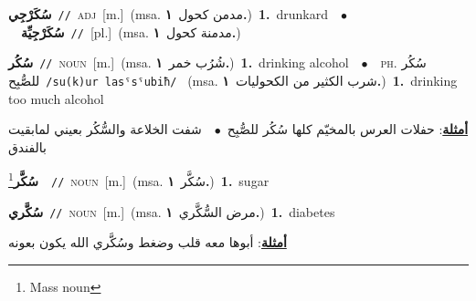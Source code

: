 \documentclass[10pt,a4paper,twoside]{article} %
\begin{document}
\begin{multicols}{2}
{\setlength\topsep{0pt}\textbf{\foreignlanguage{arabic}{سُكَرْجِي}}\ {\color{gray}\texttt{//}\color{black}}\ \textsc{adj}\ [m.]\ \color{gray}(msa. \foreignlanguage{arabic}{مدمن كحول}~\foreignlanguage{arabic}{\textbf{١.}})\color{black}\ \textbf{1.}~drunkard\ \ $\bullet$\ \ \setlength\topsep{0pt}\textbf{\foreignlanguage{arabic}{سُكَرْجِيِّة}}\ {\color{gray}\texttt{//}\color{black}}\ [pl.]\ \color{gray}(msa. \foreignlanguage{arabic}{مدمنة كحول}~\foreignlanguage{arabic}{\textbf{١.}})\color{black}\ } \vspace{2mm}

{\setlength\topsep{0pt}\textbf{\foreignlanguage{arabic}{سُكُر}}\ {\color{gray}\texttt{//}\color{black}}\ \textsc{noun}\ [m.]\ \color{gray}(msa. \foreignlanguage{arabic}{شُرُب خمر}~\foreignlanguage{arabic}{\textbf{١.}})\color{black}\ \textbf{1.}~drinking alcohol\ \ $\bullet$\ \ \textsc{ph.} \color{gray} \foreignlanguage{arabic}{سُكُر للصُّبِح}\color{black}\ {\color{gray}\texttt{/{\sffamily su(k)ur lasˤsˤubiħ}/}\color{black}}\ \color{gray} (msa. \foreignlanguage{arabic}{شرب الكثير من الكحوليات}~\foreignlanguage{arabic}{\textbf{١.}})\color{black}\ \textbf{1.}~drinking too much alcohol\  \begin{flushright}\color{gray}\foreignlanguage{arabic}{\textbf{\underline{\foreignlanguage{arabic}{أمثلة}}}: حفلات العرس بالمخيّم كلها سُكُر للصُّبِح\ $\bullet$\ \  شفت الخلاعة والسُّكُر بعيني لمابقيت بالفندق}\end{flushright}\color{black}} \vspace{2mm}

{\setlength\topsep{0pt}\textbf{\foreignlanguage{arabic}{سُكَّر}}\footnote{Mass noun}\ \ {\color{gray}\texttt{//}\color{black}}\ \textsc{noun}\ [m.]\ \color{gray}(msa. \foreignlanguage{arabic}{سُكَّر}~\foreignlanguage{arabic}{\textbf{١.}})\color{black}\ \textbf{1.}~sugar\ } \vspace{2mm}

{\setlength\topsep{0pt}\textbf{\foreignlanguage{arabic}{سُكَّري}}\ {\color{gray}\texttt{//}\color{black}}\ \textsc{noun}\ [m.]\ \color{gray}(msa. \foreignlanguage{arabic}{مرض السُّكَّري}~\foreignlanguage{arabic}{\textbf{١.}})\color{black}\ \textbf{1.}~diabetes\  \begin{flushright}\color{gray}\foreignlanguage{arabic}{\textbf{\underline{\foreignlanguage{arabic}{أمثلة}}}: أبوها معه قلب وضغط وسُكَّري الله يكون بعونه}\end{flushright}\color{black}} \vspace{2mm}


\end{multicols}
\end{document}
